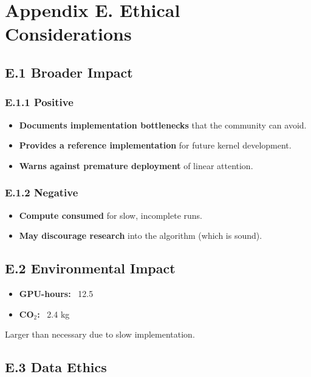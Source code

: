 \section{Appendix E. Ethical Considerations}

\subsection{E.1 Broader Impact}

\subsubsection{E.1.1 Positive}

\begin{itemize}
\item \textbf{Documents implementation bottlenecks} that the community can avoid.
\item \textbf{Provides a reference implementation} for future kernel development.
\item \textbf{Warns against premature deployment} of linear attention.

\end{itemize}
\subsubsection{E.1.2 Negative}

\begin{itemize}
\item \textbf{Compute consumed} for slow, incomplete runs.
\item \textbf{May discourage research} into the algorithm (which is sound).

\end{itemize}
\subsection{E.2 Environmental Impact}

\begin{itemize}
\item \textbf{GPU-hours:} ~12.5
\item \textbf{CO$_2$:} ~2.4 kg

\end{itemize}
Larger than necessary due to slow implementation.

\subsection{E.3 Data Ethics}

